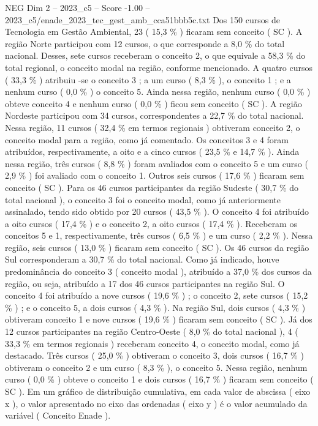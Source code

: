 \begin{textsample}{NEG Dim 2 – 2023\_c5 – Score -1.00 – 2023\_c5/enade\_2023\_tec\_gest\_amb\_cca51bbb5c.txt}
Dos 150 cursos de Tecnologia em Gestão Ambiental, 23 ( 15,3 \% ) ficaram sem conceito ( SC ).
A região Norte participou com 12 cursos, o que corresponde a 8,0 \% do total nacional.
Desses, sete cursos receberam o conceito 2, o que equivale a 58,3 \% do total regional, o conceito modal na região, conforme mencionado.
A quatro cursos ( 33,3 \% ) atribuiu -se o conceito 3 ; a um curso ( 8,3 \% ), o conceito 1 ; e a nenhum curso ( 0,0 \% ) o conceito 5.
Ainda nessa região, nenhum curso ( 0,0 \% ) obteve conceito 4 e nenhum curso ( 0,0 \% ) ficou sem conceito ( SC ).
A região Nordeste participou com 34 cursos, correspondentes a 22,7 \% do total nacional.
Nessa região, 11 cursos ( 32,4 \% em termos regionais ) obtiveram conceito 2, o conceito modal para a região, como já comentado.
Os conceitos 3 e 4 foram atribuídos, respectivamente, a oito e a cinco cursos ( 23,5 \% e 14,7 \% ).
Ainda nessa região, três cursos ( 8,8 \% ) foram avaliados com o conceito 5 e um curso ( 2,9 \% ) foi avaliado com o conceito 1.
Outros seis cursos ( 17,6 \% ) ficaram sem conceito ( SC ).
Para os 46 cursos participantes da região Sudeste ( 30,7 \% do total nacional ), o conceito 3 foi o conceito modal, como já anteriormente assinalado, tendo sido obtido por 20 cursos ( 43,5 \% ).
O conceito 4 foi atribuído a oito cursos ( 17,4 \% ) e o conceito 2, a oito cursos ( 17,4 \% ).
Receberam os conceitos 5 e 1, respectivamente, três cursos ( 6,5 \% ) e um curso ( 2,2 \% ).
Nessa região, seis cursos ( 13,0 \% ) ficaram sem conceito ( SC ).
Os 46 cursos da região Sul corresponderam a 30,7 \% do total nacional.
Como já indicado, houve predominância do conceito 3 ( conceito modal ), atribuído a 37,0 \% dos cursos da região, ou seja, atribuído a 17 dos 46 cursos participantes na região Sul.
O conceito 4 foi atribuído a nove cursos ( 19,6 \% ) ; o conceito 2, sete cursos ( 15,2 \% ) ; e o conceito 5, a dois cursos ( 4,3 \% ).
Na região Sul, dois cursos ( 4,3 \% ) obtiveram conceito 1 e nove cursos ( 19,6 \% ) ficaram sem conceito ( SC ).
Já dos 12 cursos participantes na região Centro-Oeste ( 8,0 \% do total nacional ), 4 ( 33,3 \% em termos regionais ) receberam conceito 4, o conceito modal, como já destacado.
Três cursos ( 25,0 \% ) obtiveram o conceito 3, dois cursos ( 16,7 \% ) obtiveram o conceito 2 e um curso ( 8,3 \% ), o conceito 5.
Nessa região, nenhum curso ( 0,0 \% ) obteve o conceito 1 e dois cursos ( 16,7 \% ) ficaram sem conceito ( SC ).
Em um gráfico de distribuição cumulativa, em cada valor de abscissa ( eixo x ), o valor apresentado no eixo das ordenadas ( eixo y ) é o valor acumulado da variável ( Conceito Enade ).

\end{textsample}

